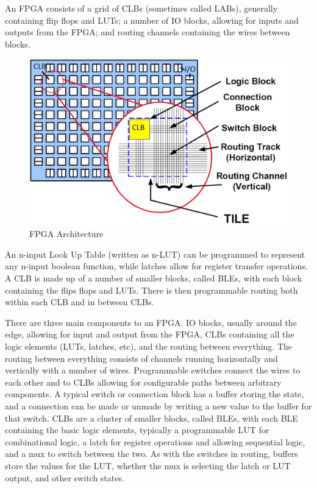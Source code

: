 \documentclass[12pt,drafta4paper,oneside]{memoir} %
\begin{document}
An \ac{FPGA} consists of a grid of \acp{CLB} (sometimes called \acp{LAB}), generally containing flip flops and \acp{LUT}; a number of \ac{IO} blocks, allowing for inputs and outputs from the \ac{FPGA}; and routing channels containing the wires between blocks.
\begin{figure}
    \includegraphics[width=\textwidth]{images/fpga-arch.png}
    \caption{FPGA Architecture\cite{WiltonLecture}}
    \label{FPGAArch}
\end{figure}
An n-input Look Up Table (written as n-LUT) can be programmed to represent any n-input boolean function, while latches allow for register transfer operations. A \ac{CLB} is made up of a number of smaller blocks, called \acp{BLE}, with each block containing the flips flops and \acp{LUT}. There is then programmable routing both within each \ac{CLB} and in between \acp{CLB}.


There are three main components to an \ac{FPGA}. \ac{IO} blocks, usually around the edge, allowing for input and output from the \ac{FPGA}, \acp{CLB} containing all the logic elements (\acp{LUT}, latches, etc), and the routing between everything.
The routing between everything consists of channels running horizontally and vertically with a number of wires. Programmable switches connect the wires to each other and to \acp{CLB} allowing for configurable paths between arbitrary components. A typical switch or connection block has a buffer storing the state, and a connection can be made or unmade by writing a new value to the buffer for that switch.
\acp{CLB} are a cluster of smaller blocks, called \acp{BLE}, with each \ac{BLE} containing the basic logic elements, typically a programmable \ac{LUT} for combinational logic, a latch for register operations and allowing sequential logic, and a \ac{mux} to switch between the two. As with the switches in routing, buffers store the values for the \ac{LUT}, whether the \ac{mux} is selecting the latch or \ac{LUT} output, and other switch states.
\end{document}
